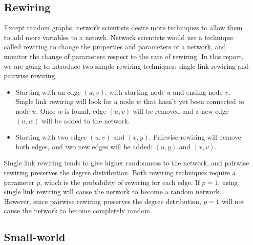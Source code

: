 \documentclass[12pt]{article}
\begin{document}
\subsection{Rewiring}
\label{rewiring}
Except random graphs, network scientists desire more techniques to allow them to add more variables to a netowk. Network scientists would use a technique called rewiring to change the properties and parameters of a network, and monitor the change of parameters respect to the rate of rewiring.\cite{network_rewiring} In this report, we are going to introduce two simple rewiring techniques: single link rewiring and pairwise rewiring.\\
\begin{itemize}
    \item Starting with an edge $(u,v)$; with starting node $u$ and ending node $v$. Single link rewiring will look for a node $w$ that hasn't yet been connected to node $u$. Once $w$ is found, edge $(u,v)$ will be removed and a new edge $(u,w)$ will be added to the network. 
    \item Starting with two edges $(u,v)$ and $(x,y)$. Pairwise rewiring will remove both edges, and two new edges will be added: $(u,y)$ and $(x,v)$.
\end{itemize}
\noindent
Single link rewiring tends to give higher randomness to the network, and pairwise rewiring preserves the degree distribution. Both rewiring techniques require a parameter $p$, which is the probability of rewiring for each edge. If $p=1$, using single link rewiring will cause the network to become a random network. However, since pairwise rewiring preserves the degree detribution, $p=1$ will not cause the network to become completely random.

\subsection{Small-world}
\label{small_world}
\end{document}
